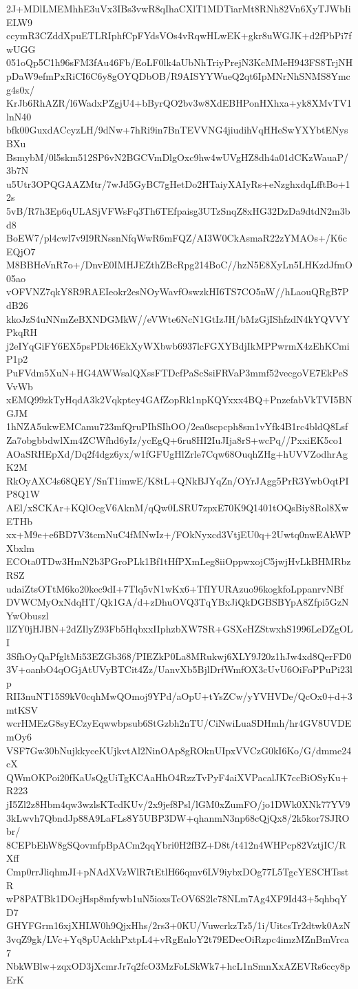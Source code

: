 2J+MDlLMEMhhE3uVx3IBs3vwR8qIhaCXlT1MDTiarMt8RNh82Vn6XyTJWbIiELW9
ccymR3CZddXpuETLRIphfCpFYdsVOs4vRqwHLwEK+gkr8uWGJK+d2fPbPi7fwUGG
051oQp5C1h96sFM3fAu46Fb/EoLF0lk4aUbNhTriyPrejN3KcMMeH943FS8TrjNH
pDaW9efmPxRiCI6C6y8gOYQDbOB/R9AISYYWueQ2qt6IpMNrNhSNMS8Ymcg4s0x/
KrJb6RhAZR/l6WadxPZgjU4+bByrQO2bv3w8XdEBHPonHXhxa+yk8XMvTV1lnN40
bfk00GuxdACcyzLH/9dNw+7hRi9in7BnTEVVNG4jiudihVqHHeSwYXYbtENysBXu
BsmybM/0l5skm512SP6vN2BGCVmDlgOxc9hw4wUVgHZ8dh4a01dCKzWauaP/3b7N
u5Utr3OPQGAAZMtr/7wJd5GyBC7gHetDo2HTaiyXAIyRs+eNzghxdqLfftBo+12s
5vB/R7h3Ep6qULASjVFWsFq3Th6TEfpaisg3UTzSnqZ8xHG32DzDa9dtdN2m3bd8
BoEW7/pl4cwl7v9I9RNssnNfqWwR6mFQZ/AI3W0CkAsmaR22zYMAOs+/K6cEQjO7
M8BBHeVnR7o+/DnvE0IMHJEZthZBcRpg214BoC//hzN5E8XyLn5LHKzdJfmO05ao
vOFVNZ7qkY8R9RAEIeokr2esNOyWavfOswzkHI6TS7CO5nW//hLaouQRgB7PdB26
kkoJzS4uNNmZeBXNDGMkW//eVWte6NcN1GtIzJH/bMzGjIShfzdN4kYQVVYPkqRH
j2eIYqGiFY6EX5psPDk46EkXyWXbwb6937lcFGXYBdjIkMPPwrmX4zEhKCmiP1p2
PuFVdm5XuN+HG4AWWsalQXssFTDcfPaScSsiFRVaP3mmf52vecgoVE7EkPeSVvWb
xEMQ99zkTyHqdA3k2Vqkptcy4GAfZopRk1npKQYxxx4BQ+PnzefabVkTVI5BNGJM
1hNZA5ukwEMCamu723mfQruPIhSIhOO/2ea0scpcph8sm1vYfk4B1rc4bldQ8Lsf
Za7obgbbdwlXm4ZCWfhd6yIz/ycEgQ+6ru8HI2IuJIja8rS+wcPq//PxxiEK5co1
AOaSRHEpXd/Dq2f4dgz6yx/w1fGFUgHlZrle7Cqw68OuqhZHg+hUVVZodhrAgK2M
RkOyAXC4s68QEY/SnT1imwE/K8tL+QNkBJYqZn/OYrJAgg5PrR3YwbOqtPIP8Q1W
AEl/xSCKAr+KQlOcgV6AknM/qQw0LSRU7zpxE70K9Q1401tOQsBiy8Rol8XwETHb
xx+M9e+e6BD7V3tcmNuC4fMNwIz+/FOkNyxcd3VtjEU0q+2Uwtq0nwEAkWPXbxlm
ECOta0TDw3HmN2b3PGroPLk1Bf1tHfPXmLeg8iiOppwxojC5jwjHvLkBHMRbzRSZ
udaiZtsOTtM6ko20kec9dI+7Tlq5vN1wKx6+TfIYURAzuo96kogkfoLppanrvNBf
DVWCMyOxNdqHT/Qk1GA/d+zDhuOVQ3TqYBxJiQkDGBSBYpA8Zfpi5GzNYwObuszl
llZY0jHJBN+2dZIlyZ93Fb5HqbxxIIphzbXW7SR+GSXeHZStwxhS1996LeDZgOLI
3SfhOyQaPfgltMi53EZGb368/PIEZkP0La8MRukwj6XLY9J20z1hJw4xd8QerFD0
3V+oanbO4qOGjAtUVyBTCit4Zz/UanvXb5BjlDrfWmfOX3cUvU6OiFoPPuPi23lp
RII3nuNT15S9kV0cqhMwQOmoj9YPd/aOpU+tYsZCw/yYVHVDe/QcOx0+d+3mtKSV
wcrHMEzG8syECzyEqwwbpsub6StGzbh2nTU/CiNwiLuaSDHmh/hr4GV8UVDEmOy6
VSF7Gw30bNujkkyceKUjkvtAl2NinOAp8gROknUIpxVVCzG0kI6Ko/G/dmme24cX
QWmOKPoi20fKaUsQgUiTgKCAaHhO4RzzTvPyF4aiXVPacalJK7ccBiOSyKu+R223
jI5Zl2z8Hbm4qw3wzlsKTcdKUv/2x9jef8Psl/lGM0xZumFO/jo1DWk0XNk77YV9
3kLwvh7QbndJp88A9LaFLs8Y5UBP3DW+qhanmN3np68cQjQx8/2k5kor7SJRObr/
8CEPbEhW8gSQovmfpBpACm2qqYbri0H2fBZ+D8t/t412n4WHPcp82VztjIC/RXff
Cmp0rrJliqhmJI+pNAdXVzWlR7tEtlH66qmv6LV9iybxDOg77L5TgcYESCHTsstR
wP8PATBk1DOcjHsp8mfywb1uN5ioxsTcOV6S2lc78NLm7Ag4XF9Id43+5qhbqYD7
GHYFGrm16xjXHLW0h9QjxHhs/2rs3+0KU/VuwcrkzTz5/1i/UitcsTr2dtwk0AzN
3vqZ9gk/LVc+Yq8pUAckhPxtpL4+vRgEnloY2t79EDecOiRzpc4imzMZnBmVrca7
NbkWBlw+zqxOD3jXcmrJr7q2fcO3MzFoLSkWk7+hcL1nSmnXxAZEVRs6ccy8pErK
